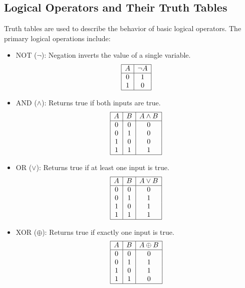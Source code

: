 \subsection{Logical Operators and Their Truth Tables}
Truth tables are used to describe the behavior of basic logical operators. The primary logical operations include:
\begin{itemize}[noitemsep, topsep=0pt]
    \item NOT (\( \neg \)): Negation inverts the value of a single variable.
    \[
    \begin{array}{|c|c|}
    \hline
    A & \neg A \\
    \hline
    0 & 1 \\
    1 & 0 \\
    \hline
    \end{array}
    \]
    
    \item AND (\( \land \)): Returns true if both inputs are true.
    \[
    \begin{array}{|c|c|c|}
    \hline
    A & B & A \land B \\
    \hline
    0 & 0 & 0 \\
    0 & 1 & 0 \\
    1 & 0 & 0 \\
    1 & 1 & 1 \\
    \hline
    \end{array}
    \]
    
    \item OR (\( \lor \)): Returns true if at least one input is true.
    \[
    \begin{array}{|c|c|c|}
    \hline
    A & B & A \lor B \\
    \hline
    0 & 0 & 0 \\
    0 & 1 & 1 \\
    1 & 0 & 1 \\
    1 & 1 & 1 \\
    \hline
    \end{array}
    \]

    \item XOR (\( \oplus \)): Returns true if exactly one input is true.
    \[
    \begin{array}{|c|c|c|}
    \hline
    A & B & A \oplus B \\
    \hline
    0 & 0 & 0 \\
    0 & 1 & 1 \\
    1 & 0 & 1 \\
    1 & 1 & 0 \\
    \hline
    \end{array}
    \]
\end{itemize}

